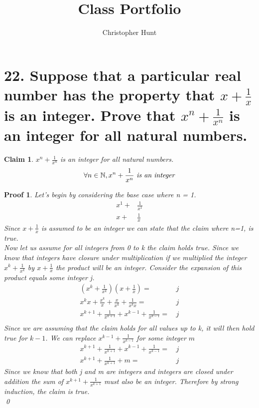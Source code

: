 \documentclass{article}
\title{Class Portfolio}
\author{Christopher Hunt}
\date{}
\newtheorem*{claim}{Claim}
\newtheorem*{poof}{Proof}
\begin{document}
\pagestyle{fancy}
\fancyhf{}
\rhead{\thepage}

\maketitle

\section*{22. Suppose that a particular real number 
 has the property that $x+\frac{1}{x}$ is an integer. Prove that $x^n+\frac{1}{x^n}$ is an integer for all natural numbers.}

\begin{claim}
     $x^n+\frac{1}{x^n}$ is an integer for all natural numbers.
     \[\forall n \in \mathbb{N}, x^n +\frac{1}{x^n}\text{ \emph{is an integer}}\]
\end{claim}
\begin{poof}
     Let's begin by considering the base case where n = 1.
    \begin{align*}
         x^1+&\frac{1}{x^1}\\         x+&\frac{1}{x}
    \end{align*}
    Since $x+\frac{1}{x}$ is assumed to be an integer we can state that the claim where n=1, is true.
    \\
    
    \noindent Now let us assume for all integers from 0 to k the claim holds true. Since we know that integers have closure under multiplication if we multiplied the integer $x^k+\frac{1}{x^k}$ by $x+\frac{1}{x}$ the product will be an integer. Consider the expansion of this product equals some integer j.
    \begin{align*}
        (x^k+\frac{1}{x^k})(x+\frac{1}{x})=&\,j\\
        x^{k}x+\frac{x^k}{x}+\frac{x}{x^k}+\frac{1}{x^{k}x}=&\,j\\
        x^{k+1}+\frac{1}{x^{k+1}}+x^{k-1}+\frac{1}{x^{k-1}}=&\,j\\
    \end{align*}
    Since we are assuming that the claim holds for all values up to k, it will then hold true for $k-1$. We can replace $x^{k-1}+\frac{1}{x^{k-1}}$ for some integer $m$
    \begin{align*}
        x^{k+1}+\frac{1}{x^{k+1}}+x^{k-1}+\frac{1}{x^{k-1}}=&\,j\\
        x^{k+1}+\frac{1}{x^{k+1}}+m=&\,j
    \end{align*}
    Since we know that both j and m are integers and integers are closed under addition the sum of $x^{k+1}+\frac{1}{x^{k+1}}$ must also be an integer. Therefore by strong induction, the claim is true.
    \\
    \qed\end{poof}
\newpage
\end{document}
